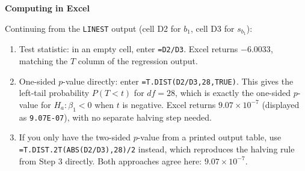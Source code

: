 %
%

\textbf{Computing in Excel}

Continuing from the \texttt{LINEST} output (cell D2 for $b_1$, cell D3 for $s_{b_1}$):

\begin{enumerate}
    \item Test statistic: in an empty cell, enter \texttt{=D2/D3}. Excel returns $-6.0033$, matching the $T$ column of the regression output.
    \item One-sided $p$-value directly: enter \texttt{=T.DIST(D2/D3,28,TRUE)}. This gives the left-tail probability $P(T < t)$ for $df = 28$, which is exactly the one-sided $p$-value for $H_a: \beta_1 < 0$ when $t$ is negative. Excel returns $9.07 \times 10^{-7}$ (displayed as \texttt{9.07E-07}), with no separate halving step needed.
    \item If you only have the two-sided $p$-value from a printed output table, use \texttt{=T.DIST.2T(ABS(D2/D3),28)/2} instead, which reproduces the halving rule from Step 3 directly. Both approaches agree here: $9.07 \times 10^{-7}$.
\end{enumerate}

